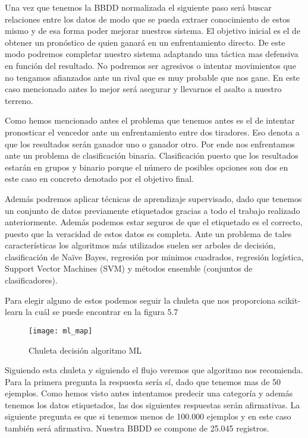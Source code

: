 Una vez que tenemos la BBDD normalizada el siguiente paso será buscar relaciones
entre los datos de modo que se pueda extraer conocimiento de estos mismo y de
esa forma poder mejorar nuestros sistema. El objetivo inicial es el de obtener
un pronóstico de quien ganará en un enfrentamiento directo. De este modo podremos
completar nuestro sistema adaptando una táctica mas defensiva en función
del resultado. No podremos ser agresivos o intentar movimientos que no tengamos afianzados
ante un rival que es muy probable que nos gane. En este caso mencionado antes lo mejor
será asegurar y llevarnos el asalto a nuestro terreno.

Como hemos mencionado antes el problema que tenemos antes es el de intentar pronosticar
el vencedor ante un enfrentamiento entre dos tiradores. Eso denota a que los resultados
serán ganador uno o ganador otro. Por ende nos enfrentamos ante un problema de clasificación
binaria. Clasificación puesto que los resultados estarán en grupos y binario porque el número
de posibles opciones son dos en este caso en concreto denotado por el objetivo final.

Además podremos aplicar técnicas de aprendizaje supervisado, dado que tenemos un conjunto de datos
previamente etiquetados gracias a todo el trabajo realizado anteriormente. Además podemos
estar seguros de que el etiquetado es el correcto, puesto que la veracidad de estos datos
es completa. Ante un problema de tales características los algoritmos más utilizados suelen ser
arboles de decisión, clasificación de Naïve Bayes, regresión por minimos cuadrados, regresión
logística, Support Vector Machines (SVM) y métodos ensemble (conjuntos de clasificadores).

Para elegir alguno de estos podemos seguir la chuleta que nos proporciona scikit-learn la cuál se
puede encontrar en la figura 5.7

\begin{figure}[htb]
  \centering
    \texttt{[image: ml\_map]}
  \caption[Chuleta decisión algoritmo ML]{Chuleta decisión algoritmo ML}
  \label{fig:Chuleta decisión algoritmo ML}
\end{figure}

Siguiendo esta chuleta y siguiendo el flujo veremos que algoritmo nos recomienda.
Para la primera pregunta la respuesta sería sí, dado que tenemos mas de 50 ejemplos.
Como hemos visto antes intentamos predecir una categoría y además tenemos los datos
etiquetados, las dos siguientes respuestas serán afirmativas. La siguiente pregunta
es que si tenemos menos de 100.000 ejemplos y en este caso también será afirmativa.
Nuestra BBDD se compone de 25.045 registros.

